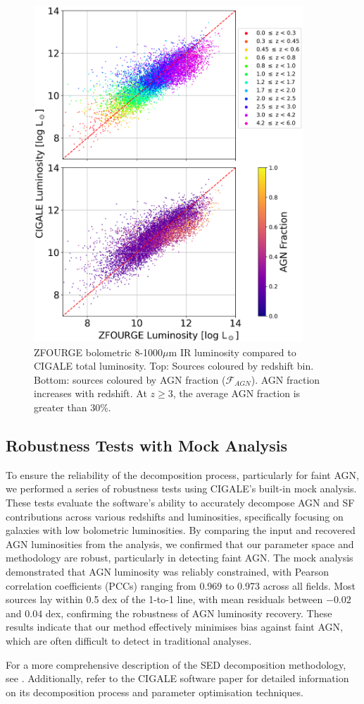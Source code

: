 \begin{figure}
    \centering
    \includegraphics[width=0.9\textwidth]{Figures/LIR_vs_LIR.png}
    \caption{ZFOURGE bolometric 8-1000$\mu$m IR luminosity compared to CIGALE total luminosity. Top: Sources coloured by redshift bin. Bottom: sources coloured by AGN fraction ($\mathcal{F}_{AGN}$). AGN fraction increases with redshift. At $z \geq 3$, the average AGN fraction is greater than 30\%.}
    \label{Fig: LIR vs LIR}
\end{figure}

\subsection{Robustness Tests with Mock Analysis} \label{Sec: Mock_Analysis}
To ensure the reliability of the decomposition process, particularly for faint AGN, we performed a series of robustness tests using CIGALE's built-in mock analysis. These tests evaluate the software's ability to accurately decompose AGN and SF contributions across various redshifts and luminosities, specifically focusing on galaxies with low bolometric luminosities. By comparing the input and recovered AGN luminosities from the analysis, we confirmed that our parameter space and methodology are robust, particularly in detecting faint AGN. The mock analysis demonstrated that AGN luminosity was reliably constrained, with Pearson correlation coefficients (PCCs) ranging from 0.969 to 0.973 across all fields. Most sources lay within 0.5 dex of the 1-to-1 line, with mean residuals between $-0.02$ and $0.04$ dex, confirming the robustness of AGN luminosity recovery. These results indicate that our method effectively minimises bias against faint AGN, which are often difficult to detect in traditional analyses.

For a more comprehensive description of the SED decomposition methodology, see \cite{cowley_decoupled_2018}. Additionally, refer to the CIGALE software paper \citep{boquien_cigale_2019} for detailed information on its decomposition process and parameter optimisation techniques.

